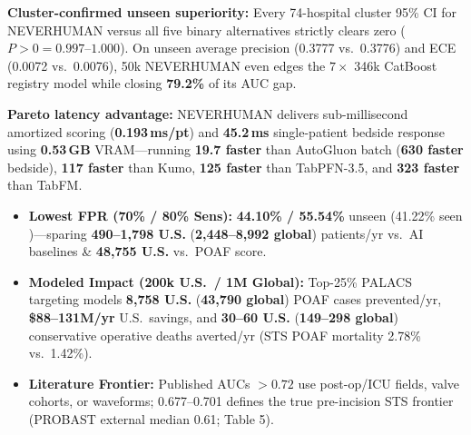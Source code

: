 \documentclass[10pt,letterpaper]{article}
\begin{document}
\vspace{4.0pt}

\noindent
\begin{minipage}[t]{0.486\textwidth}
  \vspace{0pt}
  {\fontsize{7.65}{9.5}\selectfont
  \textbf{Cluster-confirmed unseen superiority:} Every 74-hospital cluster 95\% CI for NEVERHUMAN versus all five binary alternatives strictly clears zero ($P{>}0 = 0.997$--$1.000$). On unseen average precision (0.3777 vs.\ 0.3776) and ECE (0.0072 vs.\ 0.0076), 50k NEVERHUMAN even edges the $7\times$ 346k CatBoost registry model while closing \textbf{79.2\%} of its AUC gap.

  \vspace{2.2pt}
  \textbf{Pareto latency advantage:} NEVERHUMAN delivers sub-millisecond amortized scoring (\textbf{0.193\,ms/pt}) and \textbf{45.2\,ms} single-patient bedside response using \textbf{0.53\,GB} VRAM---running \textbf{19.7\x{} faster} than AutoGluon batch (\textbf{630\x{} faster} bedside), \textbf{117\x{} faster} than Kumo, \textbf{125\x{} faster} than TabPFN-3.5, and \textbf{323\x{} faster} than TabFM.
  }

  \vspace{3.0pt}
  {\fontsize{7.6}{9.45}\selectfont
  \begin{itemize}[leftmargin=1.12em,itemsep=1.5pt,topsep=1.0pt]
    \item \textbf{Lowest FPR (70\% / 80\% Sens):} \textbf{44.10\% / 55.54\%} unseen (41.22\% seen )---sparing \textbf{490--1,798 U.S.} (\textbf{2,448--8,992 global}) patients/yr vs.\ AI baselines \& \textbf{48,755 U.S.} vs.\ POAF score.
    \item \textbf{Modeled Impact (200k U.S.\ / 1M Global):} Top-25\% PALACS targeting models \textbf{8,758 U.S.} (\textbf{43,790 global}) POAF cases prevented/yr, \textbf{\$88--131M/yr} U.S.\ savings, and \textbf{30--60 U.S.} (\textbf{149--298 global}) conservative operative deaths averted/yr (STS POAF mortality 2.78\% vs.\ 1.42\%).
    \item \textbf{Literature Frontier:} Published AUCs $>0.72$ use post-op/ICU fields, valve cohorts, or waveforms; 0.677--0.701 defines the true pre-incision STS frontier (PROBAST external median 0.61; Table 5).
  \end{itemize}
  }
\end{minipage}\hfill
\end{document}
